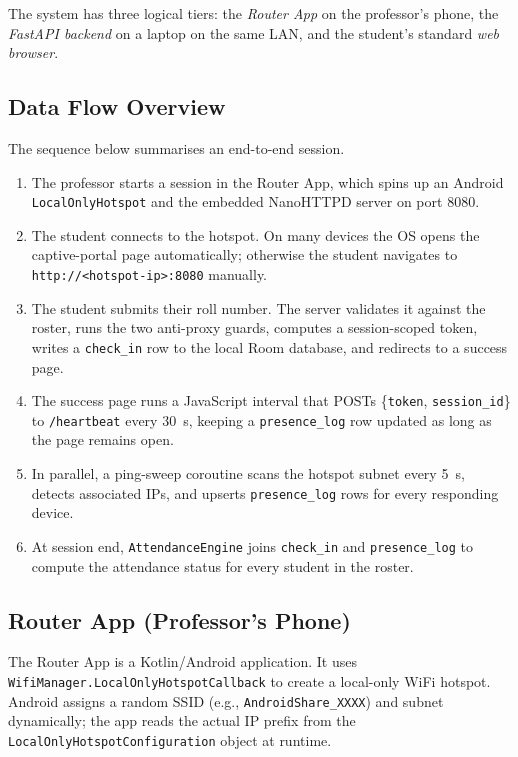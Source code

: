 \documentclass[sigconf,nonacm]{acmart}
\begin{document}
The system has three logical tiers: the \emph{Router App} on the
professor's phone, the \emph{FastAPI backend} on a laptop on the same
LAN, and the student's standard \emph{web browser}.

\subsection{Data Flow Overview}

The sequence below summarises an end-to-end session.

\begin{enumerate}
  \item The professor starts a session in the Router App, which spins
        up an Android \texttt{LocalOnly\-Hotspot} and the embedded
        NanoHTTPD server on port 8080.
  \item The student connects to the hotspot.  On many devices the OS
        opens the captive-portal page automatically; otherwise the
        student navigates to \texttt{http://<hotspot-ip>:8080}
        manually.
  \item The student submits their roll number.  The server validates it
        against the roster, runs the two anti-proxy guards, computes a
        session-scoped token, writes a \texttt{check\_in} row to the
        local Room database, and redirects to a success page.
  \item The success page runs a JavaScript interval that POSTs
        \{\texttt{token}, \texttt{session\_id}\} to
        \texttt{/heartbeat} every 30~s, keeping a \texttt{presence\_log}
        row updated as long as the page remains open.
  \item In parallel, a ping-sweep coroutine scans the hotspot subnet
        every 5~s, detects associated IPs, and upserts
        \texttt{presence\_log} rows for every responding device.
  \item At session end, \texttt{AttendanceEngine} joins
        \texttt{check\_in} and \texttt{presence\_log} to compute the
        attendance status for every student in the roster.
\end{enumerate}

\subsection{Router App (Professor's Phone)}

The Router App is a Kotlin/Android application.  It uses
\texttt{WifiManager.LocalOnlyHotspotCallback} to create a local-only
WiFi hotspot.  Android assigns a random SSID
(e.g., \texttt{AndroidShare\_XXXX}) and subnet dynamically; the app
reads the actual IP prefix from the \texttt{LocalOnlyHotspotConfiguration}
object at runtime.
\end{document}
